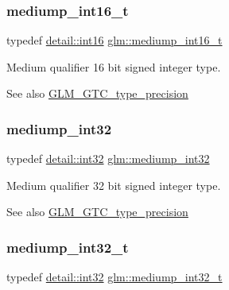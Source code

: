 \subsubsection{\texorpdfstring{mediump\+\_\+int16\+\_\+t}{mediump\_int16\_t}}
{\footnotesize\ttfamily typedef \hyperlink{namespaceglm_1_1detail_a375938874ca4f0a0982ec6373b56117b}{detail\+::int16} \hyperlink{group__gtc__type__precision_ga478fab608cf43040013d719a3e03b194}{glm\+::mediump\+\_\+int16\+\_\+t}}

Medium qualifier 16 bit signed integer type. \begin{DoxySeeAlso}{See also}
\hyperlink{group__gtc__type__precision}{G\+L\+M\+\_\+\+G\+T\+C\+\_\+type\+\_\+precision} 
\end{DoxySeeAlso}
\mbox{\label{group__gtc__type__precision_ga0660a752402702f420f13c686a7fff29}} 
\subsubsection{\texorpdfstring{mediump\+\_\+int32}{mediump\_int32}}
{\footnotesize\ttfamily typedef \hyperlink{namespaceglm_1_1detail_a9f85b4efeca416cdcec2fd08939a2e17}{detail\+::int32} \hyperlink{group__gtc__type__precision_ga0660a752402702f420f13c686a7fff29}{glm\+::mediump\+\_\+int32}}

Medium qualifier 32 bit signed integer type. \begin{DoxySeeAlso}{See also}
\hyperlink{group__gtc__type__precision}{G\+L\+M\+\_\+\+G\+T\+C\+\_\+type\+\_\+precision} 
\end{DoxySeeAlso}
\mbox{\label{group__gtc__type__precision_gafd9b4bd9e4465aec63351b59100692c4}} 
\subsubsection{\texorpdfstring{mediump\+\_\+int32\+\_\+t}{mediump\_int32\_t}}
{\footnotesize\ttfamily typedef \hyperlink{namespaceglm_1_1detail_a9f85b4efeca416cdcec2fd08939a2e17}{detail\+::int32} \hyperlink{group__gtc__type__precision_gafd9b4bd9e4465aec63351b59100692c4}{glm\+::mediump\+\_\+int32\+\_\+t}}


